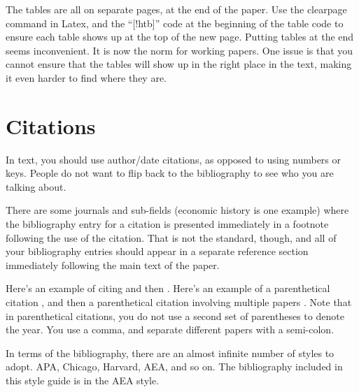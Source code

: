 \documentclass[11pt]{article}
\begin{document}
The tables are all on separate pages, at the end of the paper. Use the clearpage command in Latex, and the ``[!htb]'' code at the beginning of the table code to ensure each table shows up at the top of the new page. Putting tables at the end seems inconvenient. It is now the norm for working papers. One issue is that you cannot ensure that the tables will show up in the right place in the text, making it even harder to find where they are.

\section{Citations}
In text, you should use author/date citations, as opposed to using numbers or keys. People do not want to flip back to the bibliography to see who you are talking about. 

There are some journals and sub-fields (economic history is one example) where the bibliography entry for a citation is presented immediately in a footnote following the use of the citation. That is not the standard, though, and all of your bibliography entries should appear in a separate reference section immediately following the main text of the paper.

Here's an example of citing \citet{barro2016} and then \citet{ajs2016}. Here's an example of a parenthetical citation \citep{barro2016}, and then a parenthetical citation involving multiple papers \citep{barro2016,ajs2016}. Note that in parenthetical citations, you do not use a second set of parentheses to denote the year. You use a comma, and separate different papers with a semi-colon. 

In terms of the bibliography, there are an almost infinite number of styles to adopt. APA, Chicago, Harvard, AEA, and so on. The bibliography included in this style guide is in the AEA style. 

\clearpage %




\setcounter{section}{0}
\setcounter{equation}{0}
\renewcommand{\thesection}{Appendix \Alph{section}}
\renewcommand{\thesubsection}{A.\arabic{subsection}}
\renewcommand{\theequation}{A.\arabic{equation}}

\clearpage %
\end{document}

